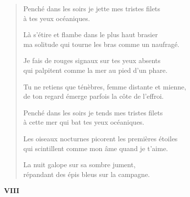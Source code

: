 \documentclass[11pt,a4paper]{book}
\begin{document}
\begin{verse}
  Penché dans les soirs je jette mes tristes filets \\
  à tes yeux océaniques.

  Là s'étire et flambe dans le plus haut brasier \\
  ma solitude qui tourne les bras comme un naufragé.

  Je fais de rouges signaux sur tes yeux absents \\
  qui palpitent comme la mer au pied d'un phare.

  Tu ne retiens que ténèbres, femme distante et mienne, \\
  de ton regard émerge parfois la côte de l'effroi.

  Penché dans les soirs je tends mes tristes filets \\
  à cette mer qui bat tes yeux océaniques.

  Les oiseaux nocturnes picorent les premières étoiles \\
  qui scintillent comme mon âme quand je t'aime.

  La nuit galope sur sa sombre jument, \\
  répandant des épis bleus sur la campagne.
\end{verse}

\newpage


\begin{center} \textbf{VIII} \end{center}

\bigskip
\end{document}
